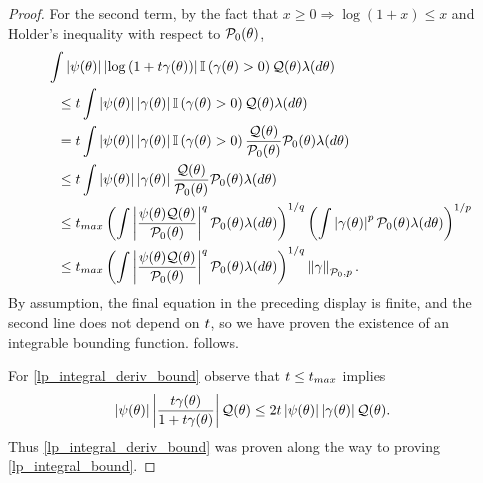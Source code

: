 \begin{lem}
\begin{proof}
For the second term, by the fact that $x \ge 0 \Rightarrow \log (1 + x) \le x$
and Holder's inequality with respect to $\mathcal{P}_{0}(\theta)$,
%
\begin{align*}
%
\MoveEqLeft
\int \abs{\psi(\theta)}
    \abs{\log\left(1 + \t \gamma(\theta)\right)}
    \ind{\gamma(\theta) > 0}
    \q(\theta)\lambda(d\theta)
\\\le{}&
\t
\int \abs{\psi(\theta)}
    \abs{\gamma(\theta)}
    \ind{\gamma(\theta) > 0}
    \q(\theta)\lambda(d\theta)
\\={}&
\t
\int \abs{\psi(\theta)}
    \abs{\gamma(\theta)}
    \ind{\gamma(\theta) > 0}
    \frac{\q(\theta)}{\pbase(\theta)} \pbase(\theta) \lambda(d\theta)
\\\le{}&
\t
\int \abs{\psi(\theta)}
    \abs{\gamma(\theta)}
    \frac{\q(\theta)}{\pbase(\theta)} \pbase(\theta) \lambda(d\theta)
\\\le{}&
\t_{max}
\left(
\int
    \abs{\frac{\psi(\theta)\q(\theta)}{\pbase(\theta)}}^q
    \pbase(\theta) \lambda(d\theta)
\right)^{1/q}
\left(
\int\abs{\gamma(\theta)}^p \pbase(\theta) \lambda(d\theta)
\right)^{1/p}
\\\le{}&
\t_{max}
\left(
\int
    \abs{\frac{\psi(\theta)\q(\theta)}{\pbase(\theta)}}^q
    \pbase(\theta) \lambda(d\theta)
\right)^{1/q}
\norm{\gamma}_{\pbase,p}.
%
\end{align*}
%
By assumption, the final equation in the preceding display is finite, and the
second line does not depend on $t$, so we have proven the existence of an
integrable bounding function.   follows.

For \eqref{lp_integral_deriv_bound} observe that $t \le t_{max}$ implies
%
\begin{align*}
%
\abs{\psi(\theta)}
    \abs{\frac{\t \gamma(\theta)}{1 + \t \gamma(\theta)}} \q(\theta)
\le{}&
2 \t \abs{\psi(\theta)} \abs{\gamma(\theta)} \q(\theta).
%
\end{align*}
%
Thus \eqref{lp_integral_deriv_bound} was proven along the way to
proving \eqref{lp_integral_bound}.
%
\end{proof}
%
\end{lem}
